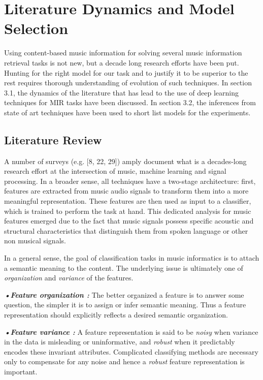 \chapter{Literature Dynamics and Model Selection } %

\label{Chapter3} %

Using content-based music information for solving several music information retrieval tasks is not new, but a decade long research efforts have been put. Hunting for the right model for our task and to justify it to be superior to the rest requires thorough understanding of evolution of such techniques. In section 3.1, the dynamics of the literature that has lead to the use of deep learning techniques for MIR tasks have been discussed. In section 3.2, the inferences from state of art techniques have been used to short list models for the experiments.       


\section{Literature Review}
A number of surveys (e.g. [8, 22, 29]) amply document what is a decades-long research effort at the intersection of music, machine learning and signal processing. In a broader sense, all techniques have a two-stage architecture: first, features are extracted from music audio signals to transform them into a more meaningful representation. These features are then used as input to a classifier, which is trained to perform the task at hand. This dedicated analysis for music features emerged due to the fact that music signals possess specific acoustic and structural characteristics that distinguish them from spoken language or other non musical signals.
\bigskip

\noindent In a general sense, the goal of classification tasks in music informatics is to attach a semantic meaning to the content. The underlying issue is ultimately one of \textit{organization} and \textit{variance} of the features. 
\bigskip

\noindent \textit{\textbf{•Feature organization :}} The better organized a feature is to answer some question, the simpler it is to assign or infer semantic meaning. Thus a feature representation should explicitly reflects a desired semantic organization.

\noindent \textit{\textbf{•Feature variance :}} A feature representation is said to be \textit{noisy} when variance in the data is misleading or uninformative, and \textit{robust} when it predictably encodes these invariant attributes. Complicated classifying methods are necessary only to compensate for any noise and hence a \textit{robust} feature representation is important.
\bigskip

